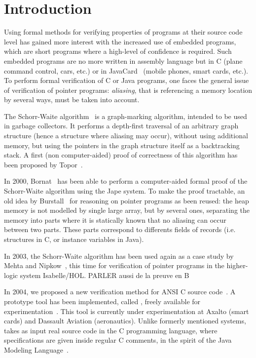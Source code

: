 
\section{Introduction}

Using formal methods for verifying properties of programs at their
source code level has gained more interest with the increased use of
embedded programs, which are short programs where a high-level of
confidence is required. Such embedded programs are no more written in
assembly language but in C (plane command control, cars, etc.) or in
JavaCard~\cite{JavaCard} (mobile phones, smart cards, etc.).  To
perform formal verification of C or Java programs, one faces the
general issue of verification of pointer programs: \emph{aliasing},
that is referencing a memory location by several ways, must be taken
into account. 

The Schorr-Waite algorithm~\cite{schorr67cacm} is a graph-marking
algorithm, intended to be used in garbage collectors. It performs a
depth-first traversal of an arbitrary graph structure (hence a
structure where aliasing may occur), without using additional memory,
but using the pointers in the graph structure itself as a backtracking
stack. A first (non computer-aided) proof of correctness of this
algorithm has been proposed by Topor~\cite{topor79acta}.

In 2000, Bornat~\cite{bornat00mpc} has been able to perform a
computer-aided formal proof of the Schorr-Waite algorithm using the
Jape system. To make the proof tractable, an old idea by
Burstall~\cite{burstall72} for reasoning on pointer programs as been
reused: the heap memory is not modelled by single large array, but by
several ones, separating the memory into parts where it is statically
known that no aliasing can occur between two parts. These parts
correspond to differents fields of records (i.e. structures in C, or
instance variables in Java).

In 2003, the Schorr-Waite algorithm has been used again as a case
study by Mehta and Nipkow~\cite{mehta03cade}, this time for
verification of pointer programs in the higher-logic system
Isabelle/HOL. PARLER aussi de la preuve en B

In 2004, we proposed a new verification method for ANSI
C source code~\cite{filliatre04icfem}.  A prototype tool has been
implemented, called \caduceus{}, freely available for
experimentation~\cite{Caduceus}. This tool is currently under
experimentation at Axalto (smart cards) and Dassault Aviation
(aeronautics). Unlike formerly mentioned systems, \caduceus{} takes as
input real source code in the C programming language, where
specifications are given inside regular C comments, in the spirit of
the Java Modeling Language~\cite{leavens00jml}. 

